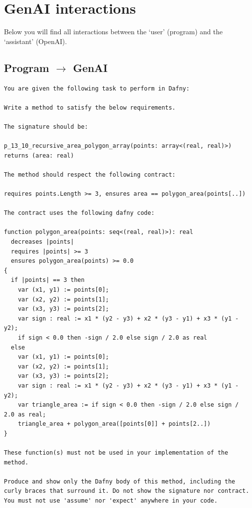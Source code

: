 \documentclass{article}
\begin{document}
\section*{GenAI interactions}
Below you will find all interactions between the `user' (program) and the `assistant' (OpenAI).
\subsection*{Program $\rightarrow$ GenAI}
\begin{lstlisting}
You are given the following task to perform in Dafny:

Write a method to satisfy the below requirements.

The signature should be:

p_13_10_recursive_area_polygon_array(points: array<(real, real)>) returns (area: real)

The method should respect the following contract:

requires points.Length >= 3, ensures area == polygon_area(points[..])

The contract uses the following dafny code:

function polygon_area(points: seq<(real, real)>): real
  decreases |points|
  requires |points| >= 3
  ensures polygon_area(points) >= 0.0
{
  if |points| == 3 then 
    var (x1, y1) := points[0];
    var (x2, y2) := points[1];
    var (x3, y3) := points[2];
    var sign : real := x1 * (y2 - y3) + x2 * (y3 - y1) + x3 * (y1 - y2);
    if sign < 0.0 then -sign / 2.0 else sign / 2.0 as real 
  else 
    var (x1, y1) := points[0];
    var (x2, y2) := points[1];
    var (x3, y3) := points[2];
    var sign : real := x1 * (y2 - y3) + x2 * (y3 - y1) + x3 * (y1 - y2);
    var triangle_area := if sign < 0.0 then -sign / 2.0 else sign / 2.0 as real;
    triangle_area + polygon_area([points[0]] + points[2..])
}

These function(s) must not be used in your implementation of the method.

Produce and show only the Dafny body of this method, including the curly braces that surround it. Do not show the signature nor contract. You must not use 'assume' nor 'expect' anywhere in your code.
\end{lstlisting}
\end{document}
